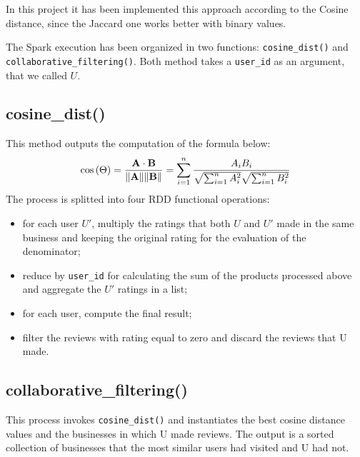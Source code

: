 \documentclass{article}
\begin{document}
In this project it has been implemented this approach according to the Cosine distance, since the Jaccard one works better with binary values. 

The Spark execution has been organized in two functions: \texttt{cosine\_dist()} and \texttt{collaborative\_filtering()}. Both method takes a \texttt{user\_id} as an argument, that we called $U$. 
    \subsection{cosine\_dist()}
    This method outputs the computation of the formula below:
    $$
    \cos{(\Theta)} = \frac{\mathbf{A}\cdot\mathbf{B}}{\norm{\mathbf{A}}\norm{\mathbf{B}}} = \sum_{i=1}^{n}\frac{A_iB_i}{\sqrt{\sum_{i=1}^{n}A^2_i}\sqrt{\sum_{i=1}^{n}B^2_i}}
    $$
    The process is splitted into four RDD functional operations:
    \begin{itemize}
        \item for each user $U'$, multiply the ratings that both $U$ and $U'$ made in the same business and keeping the original rating for the evaluation of the denominator;
        
        \item reduce by \texttt{user\_id} for calculating the sum of the products processed above and aggregate the $U'$ ratings in a list;
        \item for each user, compute the final result; %
        \item filter the reviews with rating equal to zero and discard the reviews that U made. 
    \end{itemize}

    \subsection{collaborative\_filtering()}
    This process invokes \texttt{cosine\_dist()} and instantiates the best cosine distance values and the businesses in which U made reviews. The output is a sorted collection of businesses that the most similar users had visited and U had not. 
\end{document}
